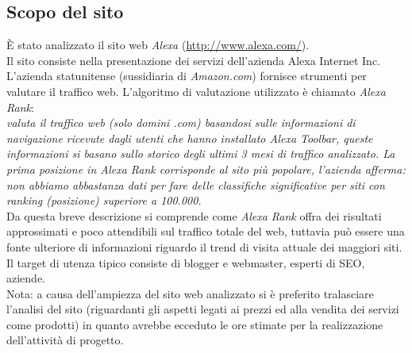 \subsection{Scopo del sito}\label{scopo}
È stato analizzato il sito web \textit{Alexa} (\url{http://www.alexa.com/}). \\
Il sito consiste nella presentazione dei servizi dell'azienda Alexa Internet Inc. \\
L'azienda statunitense (sussidiaria di \textit{Amazon.com}) fornisce 
strumenti per valutare il traffico web. L'algoritmo di valutazione utilizzato è chiamato \textit{Alexa Rank}: \\
\textit{valuta il traffico web (solo domini .com) basandosi sulle informazioni di navigazione ricevute dagli utenti che 
hanno installato Alexa Toolbar, queste informazioni si basano sullo 
storico degli ultimi 3 mesi di traffico analizzato.
La prima posizione in Alexa Rank corrisponde al sito più popolare, 
l'azienda afferma: non abbiamo abbastanza dati per fare delle classifiche 
significative per siti con ranking (posizione) superiore a 100.000.} \\
Da questa breve descrizione si comprende come \textit{Alexa Rank} offra dei risultati approssimati e poco attendibili sul traffico totale del web, tuttavia può 
essere una fonte ulteriore di informazioni riguardo il trend di visita attuale dei maggiori siti.\\ 
Il target di utenza tipico consiste di blogger e webmaster, esperti di SEO, 
aziende.\\
Nota: a causa dell'ampiezza del sito web analizzato si è preferito tralasciare l'analisi  del sito (riguardanti gli aspetti
legati ai prezzi ed alla vendita dei servizi come prodotti) in quanto 
avrebbe ecceduto le ore stimate per la realizzazione dell'attività di progetto.
